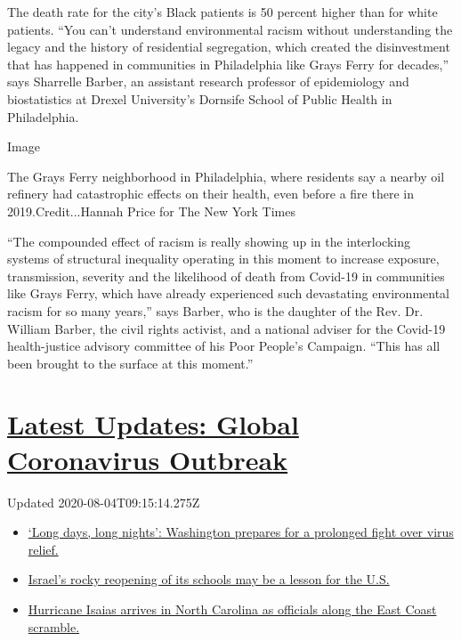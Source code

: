 The death rate for the city's Black patients is 50 percent higher than
for white patients. ``You can't understand environmental racism without
understanding the legacy and the history of residential segregation,
which created the disinvestment that has happened in communities in
Philadelphia like Grays Ferry for decades,'' says Sharrelle Barber, an
assistant research professor of epidemiology and biostatistics at Drexel
University's Dornsife School of Public Health in Philadelphia.

Image

The Grays Ferry neighborhood in Philadelphia, where residents say a
nearby oil refinery had catastrophic effects on their health, even
before a fire there in 2019.Credit...Hannah Price for The New York Times

``The compounded effect of racism is really showing up in the
interlocking systems of structural inequality operating in this moment
to increase exposure, transmission, severity and the likelihood of death
from Covid-19 in communities like Grays Ferry, which have already
experienced such devastating environmental racism for so many years,''
says Barber, who is the daughter of the Rev. Dr. William Barber, the
civil rights activist, and a national adviser for the Covid-19
health-justice advisory committee of his Poor People's Campaign. ``This
has all been brought to the surface at this moment.''

\hypertarget{latest-updates-global-coronavirus-outbreak}{%
\section{\texorpdfstring{\href{https://www.nytimes3xbfgragh.onion/2020/08/04/world/coronavirus-covid-19.html?action=click\&pgtype=Article\&state=default\&region=MAIN_CONTENT_1\&context=storylines_live_updates}{Latest
Updates: Global Coronavirus
Outbreak}}{Latest Updates: Global Coronavirus Outbreak}}\label{latest-updates-global-coronavirus-outbreak}}

Updated 2020-08-04T09:15:14.275Z

\begin{itemize}
\tightlist
\item
  \href{https://www.nytimes3xbfgragh.onion/2020/08/04/world/coronavirus-covid-19.html?action=click\&pgtype=Article\&state=default\&region=MAIN_CONTENT_1\&context=storylines_live_updates\#link-6b644638}{`Long
  days, long nights': Washington prepares for a prolonged fight over
  virus relief.}
\item
  \href{https://www.nytimes3xbfgragh.onion/2020/08/04/world/coronavirus-covid-19.html?action=click\&pgtype=Article\&state=default\&region=MAIN_CONTENT_1\&context=storylines_live_updates\#link-7af9fca0}{Israel's
  rocky reopening of its schools may be a lesson for the U.S.}
\item
  \href{https://www.nytimes3xbfgragh.onion/2020/08/04/world/coronavirus-covid-19.html?action=click\&pgtype=Article\&state=default\&region=MAIN_CONTENT_1\&context=storylines_live_updates\#link-33bf9168}{Hurricane
  Isaias arrives in North Carolina as officials along the East Coast
  scramble.}
\end{itemize}

